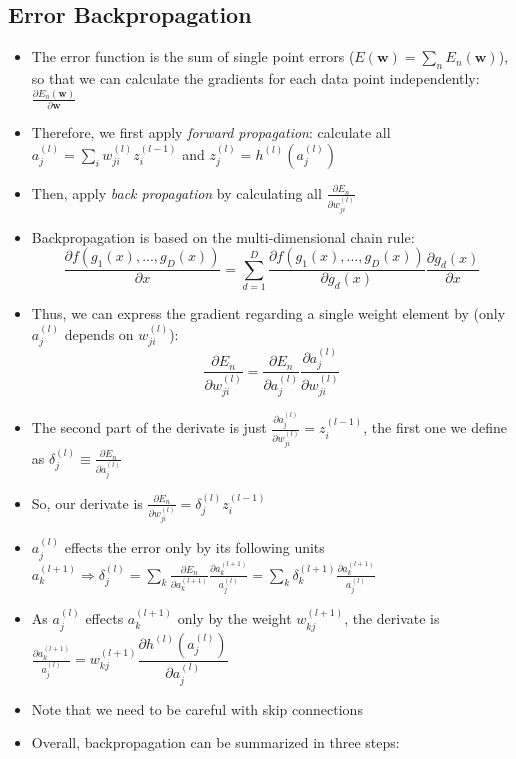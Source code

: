 \subsection{Error Backpropagation}
\begin{itemize}
	\item The error function is the sum of single point errors ($E(\bm{w})=\sum_{n}E_n(\bm{w})$), so that we can calculate the gradients for each data point independently: $\frac{\partial E_n(\bm{w})}{\partial \bm{w}}$ 
	\item Therefore, we first apply \textit{forward propagation}: calculate all $a_j^{(l)} = \sum_i w_{ji}^{(l)}z_i^{(l-1)}$ and $z_j^{(l)}=h^{(l)}\left(a_j^{(l)}\right)$
	\item Then, apply \textit{back propagation} by calculating all $\frac{\partial E_n}{\partial w_{ji}^{(l)}}$
	\item Backpropagation is based on the multi-dimensional chain rule: 
	$$\frac{\partial f\left(g_1\left(x\right), ..., g_D\left(x\right) \right)}{\partial x} = \sum\limits_{d=1}^{D}\frac{\partial f\left(g_1\left(x\right), ..., g_D\left(x\right)\right)}{\partial g_d(x)}\frac{\partial g_d(x)}{\partial x}$$
	\item Thus, we can express the gradient regarding a single weight element by (only $a_{j}^{(l)}$ depends on $w_{ji}^{(l)}$):
	$$\frac{\partial E_n}{\partial w_{ji}^{(l)}}=\frac{\partial E_n}{\partial a_{j}^{(l)}}\frac{\partial a_{j}^{(l)}}{\partial w_{ji}^{(l)}}$$
	\item The second part of the derivate is just $\frac{\partial a_{j}^{(l)}}{\partial w_{ji}^{(l)}}=z_{i}^{(l-1)}$, the first one we define as $\delta_j^{(l)}\equiv \frac{\partial E_n}{\partial a_j^{(l)}}$
	\item So, our derivate is $\frac{\partial E_n}{\partial w_{ji}^{(l)}}=\delta_j^{(l)}z_{i}^{(l-1)}$
	\item $a_j^{(l)}$ effects the error only by its following units $a_k^{(l+1)}\Rightarrow \delta_j^{(l)}=\sum_{k}\frac{\partial E_n}{\partial a_k^{(l+1)}}\frac{\partial a_k^{(l+1)}}{a_j^{(l)}} = \sum_{k}\delta_{k}^{(l+1)}\frac{\partial a_k^{(l+1)}}{a_j^{(l)}}$
	\item As $a_j^{(l)}$ effects $a_k^{(l+1)}$ only by the weight $w_{kj}^{(l+1)}$, the derivate is $\frac{\partial a_k^{(l+1)}}{a_j^{(l)}}=w_{kj}^{(l+1)} \dfrac{\partial h^{(l)} \left(a_{j}^{(l)}\right)}{\partial a_{j}^{(l)}}$
	\item Note that we need to be careful with skip connections
	\item Overall, backpropagation can be summarized in three steps:

\end{itemize}
